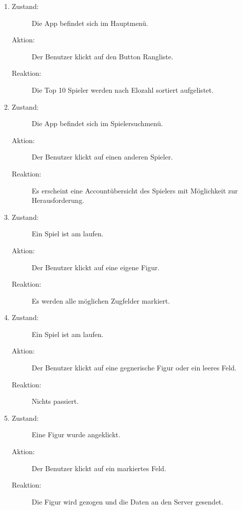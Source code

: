 \documentclass[parskip=full]{scrartcl}
\begin{document}
\begin{enumerate}
	\item
	\begin{description}
	\item[Zustand:] Die App befindet sich im Hauptmenü.
	\item[Aktion:] Der Benutzer klickt auf den Button \glqq Rangliste\grqq.
	\item[Reaktion:] Die Top 10 Spieler werden nach Elozahl sortiert aufgelistet.  \\
	\end{description}
	
	\item
	\begin{description}
	\item[Zustand:] Die App befindet sich im Spielersuchmenü.
	\item[Aktion:] Der Benutzer klickt auf einen anderen Spieler.
	\item[Reaktion:] Es erscheint eine Accountübersicht des Spielers mit Möglichkeit zur Herausforderung.  \\
	\end{description}
	
	\item 
	\begin{description}
	\item[Zustand:] Ein Spiel ist am laufen.
	\item[Aktion:] Der Benutzer klickt auf eine eigene Figur.
	\item[Reaktion:] Es werden alle möglichen Zugfelder markiert.  \\
	\end{description}
	
	\item 
	\begin{description}
	\item[Zustand:] Ein Spiel ist am laufen.
	\item[Aktion:] Der Benutzer klickt auf eine gegnerische Figur oder ein leeres Feld.
	\item[Reaktion:] Nichts passiert.  \\
	\end{description}
	
	
	\item
	\begin{description}
	\item[Zustand:] Eine Figur wurde angeklickt.
	\item[Aktion:] Der Benutzer klickt auf ein markiertes Feld.
	\item[Reaktion:] Die Figur wird gezogen und die Daten an den Server gesendet.  \\
	\end{description}
	

\end{enumerate}
\end{document}
